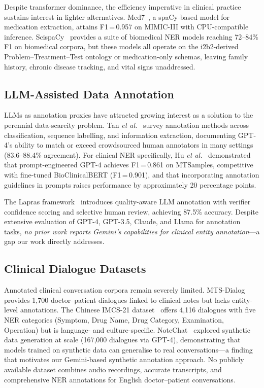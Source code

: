 \documentclass[conference]{IEEEtran}
\newcommand{\etal}{\textit{et al.}}
\begin{document}
Despite transformer dominance, the efficiency imperative in clinical practice
sustains interest in lighter alternatives. Med7~\cite{kormilitzin2021med7}, a
spaCy-based model for medication extraction, attains F1\,=\,0.957 on MIMIC-III
with CPU-compatible inference. ScispaCy~\cite{neumann2019scispacy} provides a
suite of biomedical NER models reaching 72–84\% F1 on biomedical corpora, but
these models all operate on the i2b2-derived Problem–Treatment–Test ontology
or medication-only schemas, leaving family history, chronic disease tracking,
and vital signs unaddressed.

\subsection{LLM-Assisted Data Annotation}

LLMs as annotation proxies have attracted growing interest as a solution to
the perennial data-scarcity problem. Tan \etal~\cite{tan2024llm} survey
annotation methods across classification, sequence labelling, and information
extraction, documenting GPT-4's ability to match or exceed crowdsourced human
annotators in many settings (83.6–88.4\% agreement). For clinical NER
specifically, Hu \etal~\cite{hu2024improving} demonstrated that prompt-engineered
GPT-4 achieves F1\,=\,0.861 on MTSamples, competitive with fine-tuned
BioClinicalBERT (F1\,=\,0.901), and that incorporating annotation guidelines
in prompts raises performance by approximately 20 percentage points.

The Lapras framework~\cite{li2023lapras} introduces quality-aware LLM annotation
with verifier confidence scoring and selective human review, achieving 87.5\%
accuracy. Despite extensive evaluation of GPT-4, GPT-3.5, Claude, and Llama
for annotation tasks, \emph{no prior work reports Gemini's capabilities for
clinical entity annotation}—a gap our work directly addresses.

\subsection{Clinical Dialogue Datasets}

Annotated clinical conversation corpora remain severely limited. MTS-Dialog
\cite{abacha2023mtsdialog} provides 1,700 doctor–patient dialogues linked to
clinical notes but lacks entity-level annotations. The Chinese IMCS-21
dataset~\cite{chen2022imcs21} offers 4,116 dialogues with five NER categories
(Symptom, Drug Name, Drug Category, Examination, Operation) but is language-
and culture-specific. NoteChat~\cite{wang2024notechat} explored synthetic data
generation at scale (167,000 dialogues via GPT-4), demonstrating that models
trained on synthetic data can generalise to real conversations—a finding that
motivates our Gemini-based synthetic annotation approach. No publicly available
dataset combines audio recordings, accurate transcripts, and comprehensive NER
annotations for English doctor–patient conversations.
\end{document}
